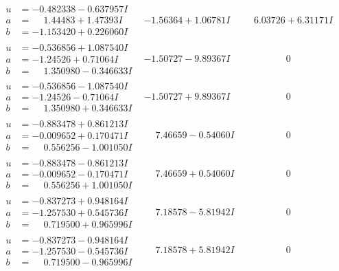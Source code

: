 \documentclass[1p]{elsarticle_modified}
\theoremstyle{definition}
\begin{document}
$$\begin{array}{c|c|c}
\begin{aligned}
u &= -0.482338 - 0.637957 I \\
a &= \phantom{-}1.44483 + 1.47393 I \\
b &= -1.153420 + 0.226060 I\end{aligned}
 & -1.56364 + 1.06781 I & \phantom{-}6.03726 + 6.31171 I \\ \hline\begin{aligned}
u &= -0.536856 + 1.087540 I \\
a &= -1.24526 + 0.71064 I \\
b &= \phantom{-}1.350980 - 0.346633 I\end{aligned}
 & -1.50727 - 9.89367 I & \phantom{-0.000000 } 0 \\ \hline\begin{aligned}
u &= -0.536856 - 1.087540 I \\
a &= -1.24526 - 0.71064 I \\
b &= \phantom{-}1.350980 + 0.346633 I\end{aligned}
 & -1.50727 + 9.89367 I & \phantom{-0.000000 } 0 \\ \hline\begin{aligned}
u &= -0.883478 + 0.861213 I \\
a &= -0.009652 + 0.170471 I \\
b &= \phantom{-}0.556256 - 1.001050 I\end{aligned}
 & \phantom{-}7.46659 - 0.54060 I & \phantom{-0.000000 } 0 \\ \hline\begin{aligned}
u &= -0.883478 - 0.861213 I \\
a &= -0.009652 - 0.170471 I \\
b &= \phantom{-}0.556256 + 1.001050 I\end{aligned}
 & \phantom{-}7.46659 + 0.54060 I & \phantom{-0.000000 } 0 \\ \hline\begin{aligned}
u &= -0.837273 + 0.948164 I \\
a &= -1.257530 + 0.545736 I \\
b &= \phantom{-}0.719500 + 0.965996 I\end{aligned}
 & \phantom{-}7.18578 - 5.81942 I & \phantom{-0.000000 } 0 \\ \hline\begin{aligned}
u &= -0.837273 - 0.948164 I \\
a &= -1.257530 - 0.545736 I \\
b &= \phantom{-}0.719500 - 0.965996 I\end{aligned}
 & \phantom{-}7.18578 + 5.81942 I & \phantom{-0.000000 } 0\\

\end{array}$$
\end{document}
